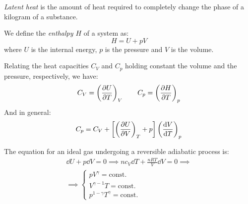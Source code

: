 \documentclass[../../../main.tex]{subfiles}
\begin{document}
\begin{multicols}{2}
\begin{definition}
        \textit{Latent heat} is the amount of heat required to completely change the phase of a kilogram of a substance.
    \end{definition}
    \begin{definition}[Enthalpy]
        We define the \textit{enthalpy $H$} of a system as: $$H=U+pV$$
        where $U$ is the internal energy, $p$ is the pressure and $V$ is the volume.
    \end{definition}
    \begin{prop}
        Relating the heat capacities $C_V$ and $C_p$ holding constant the volume and the pressure, respectively, we have:
        $$C_V=\left(\pdv{U}{T}\right)_V\qquad C_p=\left(\pdv{H}{T}\right)_p$$
        And in general:
        $$C_p=C_V+\left[\left(\pdv{U}{V}\right)_T+p\right]\left(\dv{V}{T}\right)_p$$
    \end{prop}
    \begin{prop}
        The equation for an ideal gas undergoing a reversible adiabatic process is:
        \begin{multline*}
            \dd U+p\dd V=0\implies nc_V\dd T+\frac{nRT}{V}\dd V=0\implies\\\implies\left\{
            \begin{array}{c}
                pV^\gamma=\text{const.}      \\
                V^{\gamma-1} T=\text{const.} \\
                p^{1-\gamma}T^\gamma=\text{const.}
            \end{array}\right.
        \end{multline*}
    \end{prop}

\end{multicols}
\end{document}
